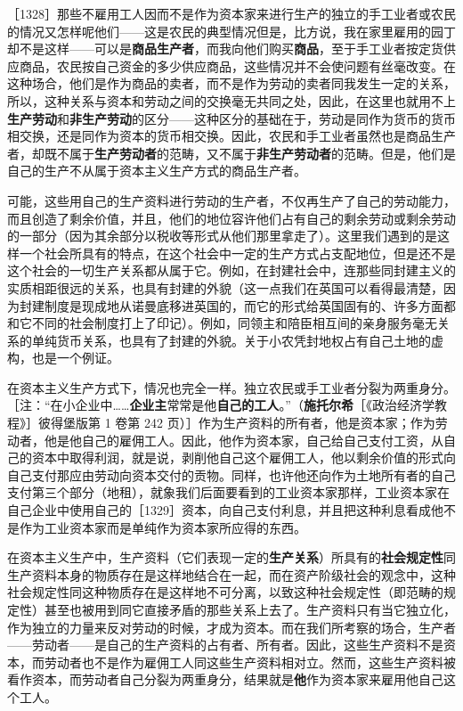 ［1328］那些不雇用工人因而不是作为资本家来进行生产的独立的手工业者或农民的情况又怎样呢他们——这是农民的典型情况\fontbox{~\{}但是，比方说，我在家里雇用的园丁却不是这样\fontbox{\}~}——可以是\textbf{商品生产者}，而我向他们购买\textbf{商品}，至于手工业者按定货供应商品，农民按自己资金的多少供应商品，这些情况并不会使问题有丝毫改变。在这种场合，他们是作为商品的卖者，而不是作为劳动的卖者同我发生一定的关系，所以，这种关系与资本和劳动之间的交换毫无共同之处，因此，在这里也就用不上\textbf{生产劳动}和\textbf{非生产劳动}的区分——这种区分的基础在于，劳动是同作为货币的货币相交换，还是同作为资本的货币相交换。因此，农民和手工业者虽然也是商品生产者，却既不属于\textbf{生产劳动者}的范畴，又不属于\textbf{非生产劳动者}的范畴。但是，他们是自己的生产不从属于资本主义生产方式的商品生产者。

可能，这些用自己的生产资料进行劳动的生产者，不仅再生产了自己的劳动能力，而且创造了剩余价值，并且，他们的地位容许他们占有自己的剩余劳动或剩余劳动的一部分（因为其余部分以税收等形式从他们那里拿走了）。这里我们遇到的是这样一个社会所具有的特点，在这个社会中一定的生产方式占支配地位，但是还不是这个社会的一切生产关系都从属于它。例如，在封建社会中，连那些同封建主义的实质相距很远的关系，也具有封建的外貌（这一点我们在英国可以看得最清楚，因为封建制度是现成地从诺曼底移进英国的，而它的形式给英国固有的、许多方面都和它不同的社会制度打上了印记）。例如，同领主和陪臣相互间的亲身服务毫无关系的单纯货币关系，也具有了封建的外貌。关于小农凭封地权占有自己土地的虚构，也是一个例证。

在资本主义生产方式下，情况也完全一样。独立农民或手工业者分裂为两重身分。［注：“在小企业中……\textbf{企业主}常常是他\textbf{自己的工人}。”（\textbf{施托尔希}［《政治经济学教程》］彼得堡版第 1 卷第 242 页）］作为生产资料的所有者，他是资本家；作为劳动者，他是他自己的雇佣工人。因此，他作为资本家，自己给自己支付工资，从自己的资本中取得利润，就是说，剥削他自己这个雇佣工人，他以剩余价值的形式向自己支付那应由劳动向资本交付的贡物。同样，也许他还向作为土地所有者的自己支付第三个部分（地租），就象我们后面要看到的工业资本家那样，工业资本家在自己企业中使用自己的［1329］资本，向自己支付利息，并且把这种利息看成他不是作为工业资本家而是单纯作为资本家所应得的东西。

在资本主义生产中，生产资料（它们表现一定的\textbf{生产关系}）所具有的\textbf{社会规定性}同生产资料本身的物质存在是这样地结合在一起，而在资产阶级社会的观念中，这种社会规定性同这种物质存在是这样地不可分离，以致这种社会规定性（即范畴的规定性）甚至也被用到同它直接矛盾的那些关系上去了。生产资料只有当它独立化，作为独立的力量来反对劳动的时候，才成为资本。而在我们所考察的场合，生产者——劳动者——是自己的生产资料的占有者、所有者。因此，这些生产资料不是资本，而劳动者也不是作为雇佣工人同这些生产资料相对立。然而，这些生产资料被看作资本，而劳动者自己分裂为两重身分，结果就是\textbf{他}作为资本家来雇用他自己这个工人。

